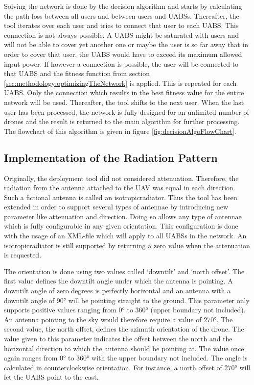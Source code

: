 \begin{minipage}{0.4\textwidth}\vspace{-120pt}%
Solving the network is done by the decision algorithm and starts by calculating the path loss between all users and between users and \gls{UABS}s.
Thereafter, the tool iterates over each user and tries to connect that user to each \gls{UABS}. This connection is not always possible. A \gls{UABS} might be saturated with users and 
will not be able to cover yet another one or maybe the user is so far away that in order to cover that user, the \gls{UABS} would have to exceed its maximum allowed input power.
If however a connection is possible, the user will be connected to that \gls{UABS} and the fitness function from section \ref{sec:methodology:optimizingTheNetwork} is applied. 
This is repeated for each \gls{UABS}. Only the connection which results in the best fitness value for the entire network will be used. Thereafter, the tool shifts to the next user. 
When the last user has been processed, the network is fully designed for an unlimited number of drones and the result is returned to the main algorithm for further processing.
The flowchart of this algorithm is given in figure \ref{fig:decisionAlgoFlowChart}.
\end{minipage}

\FloatBarrier
\subsection{Implementation of the Radiation Pattern}
\label{subsec:implementationradpat}

Originally, the deployment tool  did not considered attenuation. 
Therefore, the radiation from the antenna attached to the \gls{UAV} 
was equal in each direction. Such a fictional antenna is called an \gls{isotropicradiator}. 
Thus the tool has been extended in order 
to support several types of antennae by introducing new parameter like attenuation and direction.
Doing so allows any type of antennae which is fully configurable in any given orientation.
This configuration is done with the usage of an XML-file which will apply to all \gls{UABS}s in the network.
An \gls{isotropicradiator} is still supported by returning 
a zero value when the attenuation is requested.

The orientation is done using two values called `downtilt' and `north offset'. The first value
defines the downtilt angle under which the antenna is pointing. A downtilt angle of zero degrees is perfectly horizontal and 
an antenna with a downtilt angle of \ang{90} will be pointing straight to the ground.
This parameter only supports positive values ranging from \ang{0} to \ang{360} (upper boundary not included). An antenna pointing to the sky would therefore require a value of \ang{270}.
The second value, the north offset, defines the azimuth orientation of the drone. The value given to this parameter indicates the offset between the north
and the horizontal direction to which the antenna should be pointing at. The value once again ranges from \ang{0} to \ang{360} with the upper boundary not included. The
angle is calculated in counterclockwise orientation. For instance, a north offset of \ang{270} will let the \gls{UABS} point to the east.  

